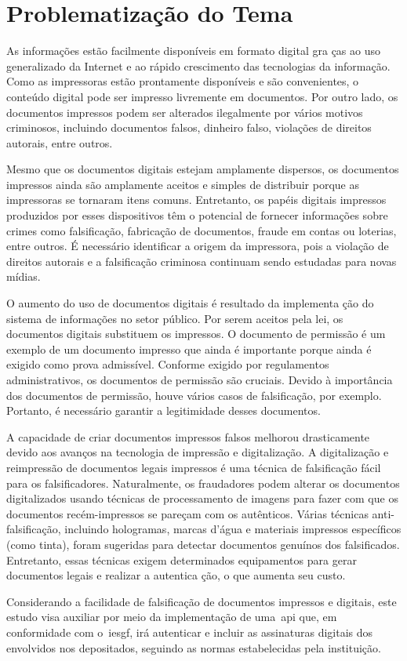 \section{Problematização do Tema}

As informações estão facilmente disponíveis em formato digital gra
ças ao uso generalizado da Internet e ao rápido crescimento das
tecnologias da informação.
Como as impressoras estão prontamente disponíveis e são
convenientes, o conteúdo digital pode ser
impresso livremente em documentos.
Por outro lado, os documentos impressos podem ser alterados
ilegalmente por vários motivos criminosos, incluindo documentos
falsos, dinheiro falso, violações
de direitos autorais, entre outros\cite{tsai2019}.

Mesmo que os documentos digitais estejam amplamente dispersos, os
documentos impressos ainda são amplamente aceitos e simples de
distribuir porque as impressoras se tornaram itens comuns.
Entretanto, os papéis digitais impressos produzidos por esses
dispositivos têm o potencial de fornecer informações sobre crimes
como falsificação, fabricação de documentos, fraude em contas ou
loterias, entre outros.
É necessário identificar a origem da impressora, pois a violação de
direitos autorais e a falsificação criminosa continuam sendo
estudadas para novas mídias\cite{tsai2019}.

O aumento do uso de documentos digitais é resultado da implementa
ção do sistema de informações no setor público.
Por serem aceitos pela lei, os documentos digitais substituem os
impressos.
O documento de permissão é um exemplo de um documento impresso que
ainda é importante porque ainda é exigido como prova admissível.
Conforme exigido por regulamentos administrativos, os documentos de
permissão são cruciais.
Devido à importância dos documentos de permissão, houve vários
casos de falsificação, por exemplo.
Portanto, é necessário garantir a legitimidade desses documentos\cite{
    arief2019}.

A capacidade de criar documentos impressos falsos melhorou
drasticamente devido aos avanços na tecnologia de impressão e
digitalização.
A digitalização e reimpressão de documentos legais impressos é uma
técnica de falsificação fácil para os falsificadores.
Naturalmente, os fraudadores podem alterar os documentos
digitalizados usando técnicas de processamento de imagens para
fazer com que os documentos recém-impressos se pareçam
com os autênticos.
Várias técnicas anti-falsificação, incluindo hologramas, marcas
d'água e materiais impressos específicos (como tinta), foram
sugeridas para detectar documentos genuínos dos falsificados.
Entretanto, essas técnicas exigem determinados equipamentos para
gerar documentos legais e realizar a autentica ção, o que aumenta
seu custo\cite{zhang2019}.

Considerando a facilidade de falsificação de documentos impressos e digitais,
este estudo visa auxiliar por meio da implementação de uma~\acrshort{api} que,
em conformidade com o~\acrlong{iesgf}, irá autenticar e incluir as assinaturas
digitais dos envolvidos nos  depositados, seguindo as normas
estabelecidas pela instituição.